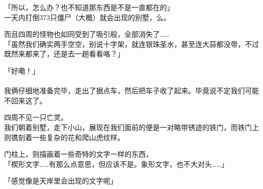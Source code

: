 「所以，怎么办？也不知道那东西是不是一直都在的」\\

一天内打倒373只僵尸（大概）就会出现的别墅，么。

而且四周的怪物也如同受到了吸引般，全部消失了……\\

「虽然我们确实两手空空，别说十字架，就连银珠圣水，甚至连大蒜都没带，不过既然来都来了，还是去一趟看看咯？」

「好嘞！」\\

\sqsplit\\

我俩仔细地准备完毕，走出了据点车，然后把车子收了起来。毕竟说不定我们可能不回来这了。

四周不见一只亡灵。\\

我们朝着别墅，走下小山，展现在我们面前的便是一对略带锈迹的铁门，而铁门上则镌刻着一些复杂的花和爬山虎纹样。

门柱上，则描画着一些奇特的文字一样的东西，\\

「楔形文字……有那么点意思，但应该不是。象形文字，也不大对头……」

「感觉像是天岸里会出现的文字呢」

